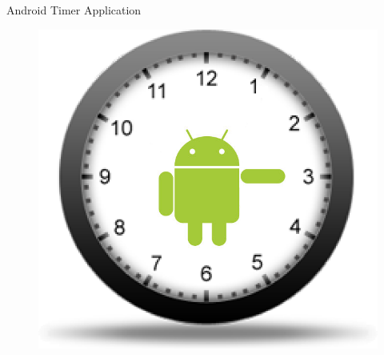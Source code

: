 \thispagestyle{empty}


\begin{center}
\Huge{Android Timer Application}
\newline
\newline
\end{center}

\begin{figure}[!h]
\begin{center}
\includegraphics[scale=0.6]{Images/frontpage_pic.png}
\end{center}
\end{figure}